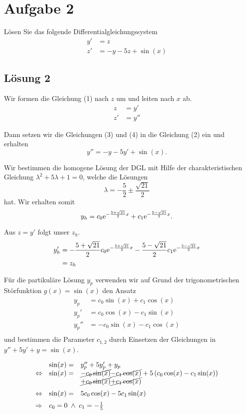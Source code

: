 \documentclass[main.tex]{subfiles}
\begin{document}
\section{Aufgabe 2}
Lösen Sie das folgende Differentialgleichungssystem
\begin{align}
    y' &= z \\
    z' &= -y - 5z + \sin(x)
\end{align}

\subsection{Lösung 2}
Wir formen die Gleichung (1) nach $z$ um und leiten nach $x$ ab.
\begin{align}
    z &= y'  \\
    z' &= y''
\end{align}

Dann setzen wir die Gleichungen (3) und (4) in die Gleichung (2) ein und erhalten
$$
    y'' = -y -5y' +\sin(x).
$$

Wir bestimmen die homogene Lösung der DGL mit Hilfe der charakteristischen Gleichung $\lambda^2 +5\lambda +1 = 0$,
welche die Lösungen
$$
    \lambda = -\frac{5}{2} \pm \frac{\sqrt{21}}{2}
$$
hat.
Wir erhalten somit
$$
    y_h = c_0 \mathrm{e}^{-\frac{5+\sqrt{21}}{2} x} + c_1 \mathrm{e}^{-\frac{5-\sqrt{21}}{2} x}.
$$

Aus $z = y'$ folgt unser $z_h$.
\begin{align*}
    y_h' &= -\frac{5+\sqrt{21}}{2} c_0 \mathrm{e}^{-\frac{5+\sqrt{21}}{2} x} -\frac{5-\sqrt{21}}{2} c_1 \mathrm{e}^{-\frac{5-\sqrt{21}}{2} x} \\
         &= z_h
\end{align*}

Für die partikuläre Lösung $y_p$ verwenden wir auf Grund der trigonometrischen Störfunktion $g(x)=\sin(x)$ den Ansatz
\begin{align*}
    y_p   &= c_0 \sin(x) + c_1 \cos(x)\\
    y_p'  &= c_0 \cos(x) - c_1 \sin(x)\\
    y_p'' &= - c_0 \sin(x) - c_1 \cos(x)\\
\end{align*}
und bestimmen die Parameter $c_{1,2}$ durch Einsetzen der Gleichungen in $y'' + 5y' + y = \sin(x)$.

\begin{equation*}
\begin{array}{crl}
                & \sin(x) =& y_p'' + 5y_p' + y_p\\
\Leftrightarrow & \sin(x) =& \cancel{- c_0 \sin(x)} \cancel{- c_1 \cos(x)} + 5 \left( c_0 \cos(x) - c_1 \sin(x) \right) \\
                &          & \cancel{+ c_0 \sin(x)} \cancel{+ c_1 \cos(x)}\\[2mm]
\Leftrightarrow & \sin(x) =& 5 c_0 \cos(x) - 5 c_1 \sin(x)\\[2mm]
\Rightarrow     & \multicolumn{2}{l}{c_0 = 0 \;\land\; c_1 = -\frac{1}{5}}
\end{array}
\end{equation*}
\end{document}

